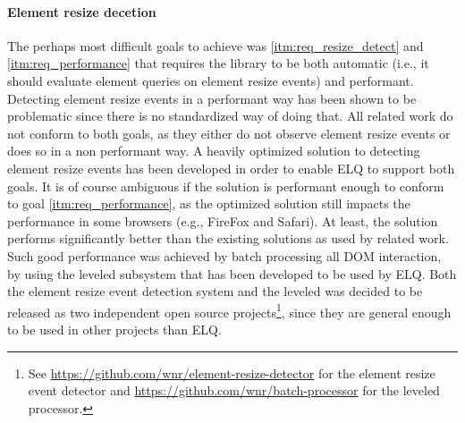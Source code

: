 \documentclass[a4paper,11pt]{kth-mag}
\begin{document}
    \paragraph{Element resize decetion}
    The perhaps most difficult goals to achieve was \ref{itm:req_resize_detect} and \ref{itm:req_performance} that requires the library to be both automatic (i.e., it should evaluate element queries on element resize events) and performant.
    Detecting element resize events in a performant way has been shown to be problematic since there is no standardized way of doing that.
    All related work do not conform to both goals, as they either do not observe element resize events or does so in a non performant way.
    A heavily optimized solution to detecting element resize events has been developed in order to enable \gls{ELQ} to support both goals.
    It is of course ambiguous if the solution is performant enough to conform to goal \ref{itm:req_performance}, as the optimized solution still impacts the performance in some \glspl{browser} (e.g., FireFox and Safari).
    At least, the solution performs significantly better than the existing solutions as used by related work.
    Such good performance was achieved by \gls{batch processing} all \gls{DOM} interaction, by using the leveled  subsystem that has been developed to be used by \gls{ELQ}.
    Both the element resize event detection system and the leveled  was decided to be released as two independent open source projects\footnote{See \url{https://github.com/wnr/element-resize-detector} for the element resize event detector and \url{https://github.com/wnr/batch-processor} for the leveled  processor.}, since they are general enough to be used in other projects than \gls{ELQ}.
\end{document}
